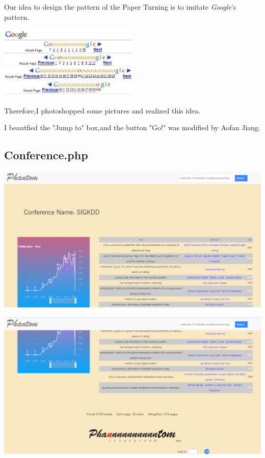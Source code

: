 \documentclass[10pt,twoside,a4paper,titlepage]{article}
\begin{document}
	Our idea to design the pattern of the Paper Turning is to imitate \emph{Google}'s pattern.
	
	\includegraphics[width=0.5\textwidth]{cyf/Google.jpg}
	
	Therefore,I photoshopped some pictures and realized this idea.
	
	I beautfied the "Jump to" box,and the button "Go!" was modified by Aofan Jiang.
	
	
	\subsection{Conference.php}

 \hspace*{\fill} 
\begin{flushleft}
	\includegraphics[width=1.0\textwidth]{cyf/Conference.PNG}
	\newline
	
	\includegraphics[width=1.0\textwidth]{cyf/Conference2.PNG}
\end{flushleft}
\end{document}
